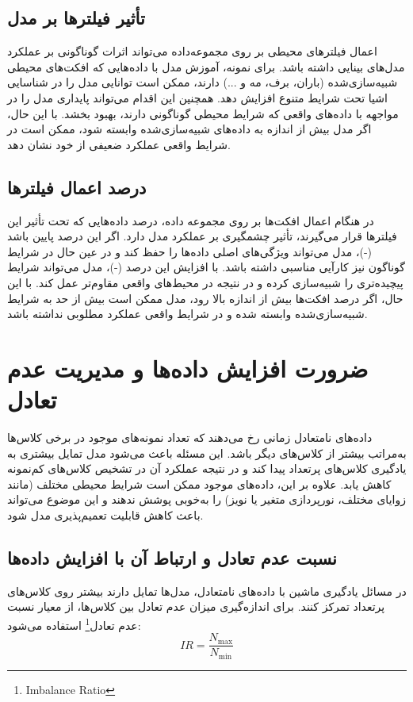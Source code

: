 \subsection{تأثیر فیلترها بر مدل}
اعمال فیلترهای محیطی بر روی مجموعه‌داده می‌تواند اثرات گوناگونی بر عملکرد مدل‌های بینایی داشته باشد. برای نمونه، آموزش مدل با داده‌هایی که افکت‌های محیطی شبیه‌سازی‌شده (باران، برف، مه و ...) دارند، ممکن است توانایی مدل را در شناسایی اشیا تحت شرایط متنوع افزایش دهد. همچنین این اقدام می‌تواند پایداری مدل را در مواجهه با داده‌های واقعی که شرایط محیطی گوناگونی دارند، بهبود بخشد. با این حال، اگر مدل بیش از اندازه به داده‌های شبیه‌سازی‌شده وابسته شود، ممکن است در شرایط واقعی عملکرد ضعیفی از خود نشان دهد.


\subsection{درصد اعمال فیلترها}
در هنگام اعمال افکت‌ها بر روی مجموعه داده، درصد داده‌هایی که تحت تأثیر این فیلترها قرار می‌گیرند، تأثیر چشمگیری بر عملکرد مدل دارد. اگر این درصد پایین باشد (-)، مدل می‌تواند ویژگی‌های اصلی داده‌ها را حفظ کند و در عین حال در شرایط گوناگون نیز کارآیی مناسبی داشته باشد. با افزایش این درصد (-)، مدل می‌تواند شرایط پیچیده‌تری را شبیه‌سازی کرده و در نتیجه در محیط‌های واقعی مقاوم‌تر عمل کند. با این حال، اگر درصد افکت‌ها بیش از اندازه بالا رود، مدل ممکن است بیش از حد به شرایط شبیه‌سازی‌شده وابسته شده و در شرایط واقعی عملکرد مطلوبی نداشته باشد.

\section{ضرورت افزایش داده‌ها و مدیریت عدم تعادل}
داده‌های نامتعادل زمانی رخ می‌دهند که تعداد نمونه‌های موجود در برخی کلاس‌ها به‌مراتب بیشتر از کلاس‌های دیگر باشد. این مسئله باعث می‌شود مدل تمایل بیشتری به یادگیری کلاس‌های پرتعداد پیدا کند و در نتیجه عملکرد آن در تشخیص کلاس‌های کم‌نمونه کاهش یابد. علاوه بر این، داده‌های موجود ممکن است شرایط محیطی مختلف (مانند زوایای مختلف، نورپردازی متغیر یا نویز) را به‌خوبی پوشش ندهند و این موضوع می‌تواند باعث کاهش قابلیت تعمیم‌پذیری مدل شود.

\subsection{نسبت عدم تعادل و ارتباط آن با افزایش داده‌ها}
در مسائل یادگیری ماشین با داده‌های نامتعادل، مدل‌ها تمایل دارند بیشتر روی کلاس‌های پرتعداد تمرکز کنند. برای اندازه‌گیری میزان عدم تعادل بین کلاس‌ها، از معیار نسبت عدم تعادل\footnote{Imbalance Ratio} استفاده می‌شود:
\[
IR = \frac{N_{\text{max}}}{N_{\text{min}}}
\]

